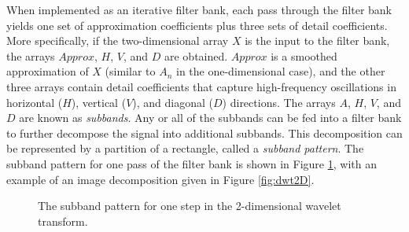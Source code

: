 When implemented as an iterative filter bank, each pass through the filter bank yields one set of approximation coefficients plus three sets of detail coefficients.
More specifically, if the two-dimensional array $X$ is the input to the filter bank, the arrays $Approx$, $H$, $V$, and $D$ are obtained.
$Approx$ is a smoothed approximation of $X$ (similar to $A_n$ in the one-dimensional case), and the other three arrays contain detail coefficients that capture high-frequency oscillations in
horizontal ($H$), vertical ($V$), and diagonal ($D$) directions.
The arrays $A$, $H$, $V$, and $D$ are known as \emph{subbands}.
Any or all of the subbands can be fed into a filter bank to further decompose the signal into additional subbands.
This decomposition can be represented by a partition of a rectangle, called a \emph{subband pattern}.
The subband pattern for one pass of the filter bank is shown in Figure \ref{fig:2dsubbands}, with an example of an image decomposition given in Figure \ref{fig:dwt2D}.

\begin{figure}[H]
\caption{The subband pattern for one step in the 2-dimensional wavelet transform.}
\label{fig:2dsubbands}
\end{figure}

